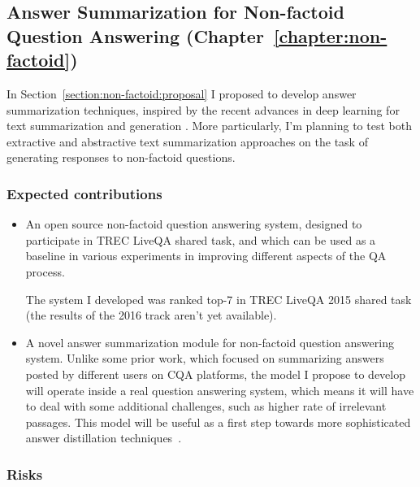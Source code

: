 \subsection{Answer Summarization for Non-factoid Question Answering (Chapter~\ref{chapter:non-factoid})}
\label{section:proposal:plan:non-factoid}

In Section~\ref{section:non-factoid:proposal} I proposed to develop answer summarization techniques, inspired by the recent advances in deep learning for text summarization \cite{rush-chopra-weston:2015:EMNLP,chopraabstractive16} and generation \cite{karpathy2015deep}.
More particularly, I'm planning to test both extractive and abstractive text summarization approaches on the task of generating responses to non-factoid questions.

\subsubsection{Expected contributions}
\label{section:proposal:plan:non-factoid:contributions}

\begin{itemize}
\item An open source non-factoid question answering system, designed to participate in TREC LiveQA shared task, and which can be used as a baseline in various experiments in improving different aspects of the QA process.

The system I developed was ranked top-7 in TREC LiveQA 2015 shared task (the results of the 2016 track aren't yet available).

\item A novel answer summarization module for non-factoid question answering system.
Unlike some prior work, which focused on summarizing answers posted by different users on CQA platforms, the model I propose to develop will operate inside a real question answering system, which means it will have to deal with some additional challenges, such as higher rate of irrelevant passages.
This model will be useful as a first step towards more sophisticated answer distillation techniques~\cite{mitra2016distillation}.

\end{itemize}

\subsubsection{Risks}
\label{section:proposal:plan:non-factoid:risks}

